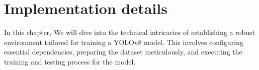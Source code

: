 \documentclass[12 pt]{report}
\begin{document}



\newpage
\chapter{Implementation details}
In this chapter, We will dive into the technical intricacies of establishing a robust environment tailored for training a YOLOv8 model. This involves configuring essential dependencies, preparing the dataset meticulously, and executing the training and testing process for the model.
\end{document}
